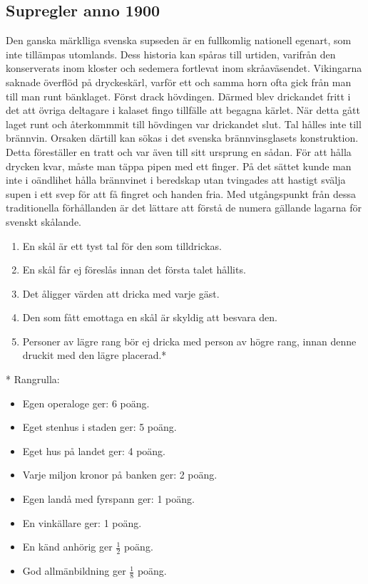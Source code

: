 \newpage
\begin{flushleft}
\section{Supregler anno 1900}
\end{flushleft}
{\large
Den ganska märklliga svenska supseden är en fullkomlig nationell egenart, som inte tillämpas utomlands.
Dess historia kan spåras till urtiden, varifrån den konserverats inom kloster och sedemera fortlevat inom skråaväsendet.
Vikingarna saknade överflöd på dryckeskärl, varför ett och samma horn ofta gick från man till man runt bänklaget.
Först drack hövdingen.
Därmed blev drickandet fritt i det att övriga deltagare i kalaset fingo tillfälle att begagna kärlet.
När detta gått laget runt och återkommmit till hövdingen var drickandet slut.
Tal hålles inte till brännvin.
Orsaken därtill kan sökas i det svenska brännvinsglasets konstruktion.
Detta föreställer en tratt och var även till sitt ursprung en sådan.
För att hålla drycken kvar, måste man täppa pipen med ett finger.
På det sättet kunde man inte i oändlihet hålla brännvinet i beredskap
utan tvingades att hastigt svälja supen i ett svep för att få fingret och handen fria.
Med utgångspunkt från dessa traditionella förhållanden
är det lättare att förstå de numera gällande lagarna för svenskt skålande.
\begin{enumerate}
\item En skål är ett tyst tal för den som tilldrickas.
\item En skål får ej föreslås innan det första talet hållits.
\item Det åligger värden att dricka med varje gäst.
\item Den som fått emottaga en skål är skyldig att besvara den.
\item Personer av lägre rang bör ej dricka med person av högre rang,
innan denne druckit med den lägre placerad.*
\end{enumerate}
\newpage

* Rangrulla:
\begin{itemize}
    \item Egen operaloge ger: 6 poäng.
    \item Eget stenhus i staden ger: 5 poäng.
    \item Eget hus på landet ger: 4 poäng.
    \item Varje miljon kronor på banken ger: 2 poäng.
    \item Egen landå med fyrspann ger: 1 poäng.
    \item En vinkällare ger: 1 poäng.
    \item En känd anhörig ger $\frac{1}{2}$ poäng.
    \item God allmänbildning ger $\frac{1}{8}$ poäng.
\end{itemize}
}

